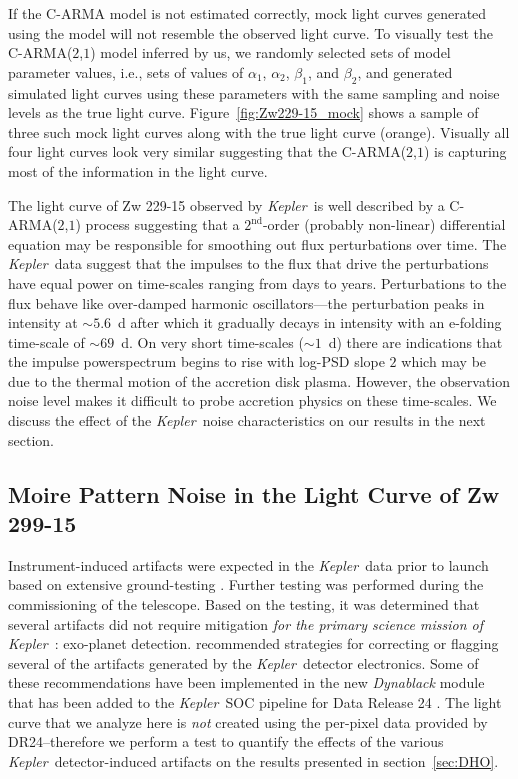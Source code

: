 \documentclass[a4paper,fleqn,usenatbib]{mnras}
\newcommand{\Kepler}{\textit{Kepler~}}
\begin{document}
If the C-ARMA model is not estimated correctly, mock light curves generated using the model will not resemble the observed light curve. To visually test the C-ARMA($2$,$1$) model inferred by us, we randomly selected sets of model parameter values, i.e., sets of values of $\alpha_{1}$, $\alpha_{2}$, $\beta_{1}$, and $\beta_{2}$, and generated simulated light curves using these parameters with the same sampling and noise levels as the true light curve. Figure~\ref{fig:Zw229-15_mock} shows a sample of three such mock light curves along with the true light curve (orange). Visually all four light curves look very similar suggesting that the C-ARMA($2$,$1$) is capturing most of the information in the light curve. 

The light curve of Zw 229-15 observed by \Kepler is well described by a C-ARMA($2$,$1$) process suggesting that a $2^{\mathrm{nd}}$-order (probably non-linear) differential equation may be responsible for smoothing out flux perturbations over time. The \Kepler data suggest that the impulses to the flux that drive the perturbations have equal power on time-scales ranging from days to years. Perturbations to the flux behave like over-damped harmonic oscillators---the perturbation peaks in intensity at $\sim 5.6$~d after which it gradually decays in intensity with an $\mathrm{e}$-folding time-scale of $\sim 69$~d. On very short time-scales ($\sim 1$~d) there are indications that the impulse powerspectrum begins to rise with log-PSD slope $2$ which may be due to the thermal motion of the accretion disk plasma. However, the observation noise level makes it difficult to probe accretion physics on these time-scales. We discuss the effect of the \Kepler noise characteristics on our results in the next section.

\subsection[Moire Pattern Noise]{Moire Pattern Noise in the Light Curve of Zw 299-15}\label{sec:MPD}

Instrument-induced artifacts were expected in the \Kepler data prior to launch based on extensive ground-testing \citep{Kol10}. Further testing was performed during the commissioning of the telescope. Based on the testing, it was determined that several artifacts did not require mitigation \textit{for the primary science mission of} \Kepler: exo-planet detection. \citet{Kol10} recommended strategies for correcting or flagging several of the artifacts generated by the \Kepler detector electronics. Some of these recommendations have been implemented in the new \textit{Dynablack} module \citep{Clarke14} that has been added to the \Kepler SOC pipeline for Data Release 24 \citep{DR24}. The light curve that we analyze here is \textit{not} created using the per-pixel data provided by DR24--therefore we perform a test to quantify the effects of the various \Kepler detector-induced artifacts on the results presented in section~\ref{sec:DHO}. 
\end{document}
